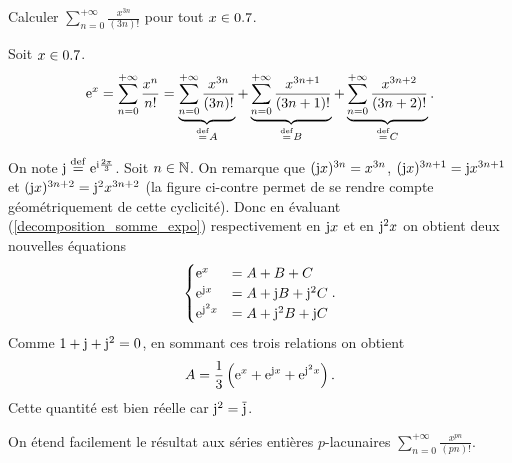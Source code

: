 \begin{exercice}
Calculer $\sum\limits_{n=0}^{+ \infty} \frac{x^{3n}}{(3n)!}$ pour tout $x \in 0.7$.
\end{exercice}

\begin{solution}
Soit $x \in 0.7$. 
\begin{align} \label{decomposition_somme_expo}
    \mathrm{e}^x = \sum_{n=0}^{+ \infty} \frac{x^n}{n!} = \underbrace{\sum_{n=0}^{+ \infty} \frac{x^{3n}}{(3n)!}}_{ \overset{\mathrm{\tiny def}}{=} A} + \underbrace{\sum_{n=0}^{+ \infty} \frac{x^{3n+1}}{(3n+1)!}}_{\overset{\mathrm{\tiny def}}{=} B} + \underbrace{\sum_{n=0}^{+ \infty} \frac{x^{3n+2}}{(3n+2)!}}_{\overset{\mathrm{\tiny def}}{=} C}.
\end{align}

\begin{marginfigure}
    
\end{marginfigure}

On note $\mathrm{j} \overset{\mathrm{\tiny def}}{=} \mathrm{e}^{\mathrm{i} \frac{2\pi}{3}}$. Soit $n \in \mathbb{N}$. On remarque que $(\mathrm{j} x)^{3n} = x^{3n}$, $(\mathrm{j} x)^{3n+1} = \mathrm{j} x^{3n+1}$ et $(\mathrm{j} x)^{3n+2} = \mathrm{j}^2 x^{3n+2}$ (la figure ci-contre permet de se rendre compte géométriquement de cette cyclicité). Donc en évaluant (\ref{decomposition_somme_expo}) respectivement en $\mathrm{j} x$ et en $\mathrm{j}^2 x$ on obtient deux nouvelles équations
$$\begin{cases}
    \mathrm{e}^x &= A + B + C \\
    \mathrm{e}^{\mathrm{j} x} &= A + \mathrm{j} B + \mathrm{j}^2 C \\
    \mathrm{e}^{\mathrm{j}^2 x} &= A + \mathrm{j}^2 B + \mathrm{j} C
\end{cases}.$$
Comme $1 + \mathrm{j} + \mathrm{j}^2 = 0$, en sommant ces trois relations on obtient
$$A = \frac{1}{3} \left(\mathrm{e}^x + \mathrm{e}^{\mathrm{j} x}+ \mathrm{e}^{\mathrm{j}^2 x} \right).$$
Cette quantité est bien réelle car $\mathrm{j}^2 = \overline{\mathrm{j}}$.
\end{solution}

\begin{remarque}
    On étend facilement le résultat aux séries entières $p$-lacunaires $\sum\limits_{n=0}^{+ \infty} \frac{x^{pn}}{(pn)!}$.
\end{remarque}